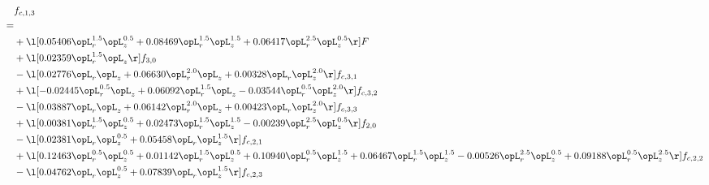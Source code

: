 \begin{alignat}{2} 
\label{eq:f_13_2} 
& f_{c,1,3} \nonumber \\ 
 = \\ 
& + \l[  0.05406 \opL_r^{1.5} \opL_z^{0.5} +  0.08469 \opL_r^{1.5} \opL_z^{1.5} +  0.06417 \opL_r^{2.5} \opL_z^{0.5}  \r] F \nonumber \\ 
& + \l[  0.02359 \opL_r^{1.5} \opL_z  \r] f_{3,0} \nonumber \\ 
& - \l[  0.02776 \opL_r \opL_z +  0.06630 \opL_r^{2.0} \opL_z +  0.00328 \opL_r \opL_z^{2.0}  \r] f_{c,3,1} \nonumber \\ 
& + \l[  -0.02445 \opL_r^{0.5} \opL_z +  0.06092 \opL_r^{1.5} \opL_z   -0.03544 \opL_r^{0.5} \opL_z^{2.0}  \r] f_{c,3,2} \nonumber \\ 
& - \l[  0.03887 \opL_r \opL_z +  0.06142 \opL_r^{2.0} \opL_z +  0.00423 \opL_r \opL_z^{2.0}  \r] f_{c,3,3} \nonumber \\ 
& + \l[  0.00381 \opL_r^{1.5} \opL_z^{0.5} +  0.02473 \opL_r^{1.5} \opL_z^{1.5}   -0.00239 \opL_r^{2.5} \opL_z^{0.5}  \r] f_{2,0} \nonumber \\ 
& - \l[  0.02381 \opL_r \opL_z^{0.5} +  0.05458 \opL_r \opL_z^{1.5}  \r] f_{c,2,1} \nonumber \\ 
& + \l[  0.12463 \opL_r^{0.5} \opL_z^{0.5} +  0.01142 \opL_r^{1.5} \opL_z^{0.5} +  0.10940 \opL_r^{0.5} \opL_z^{1.5} +  0.06467 \opL_r^{1.5} \opL_z^{1.5}   -0.00526 \opL_r^{2.5} \opL_z^{0.5} +  0.09188 \opL_r^{0.5} \opL_z^{2.5}  \r] f_{c,2,2} \nonumber \\ 
& - \l[  0.04762 \opL_r \opL_z^{0.5} +  0.07839 \opL_r \opL_z^{1.5}  \r] f_{c,2,3} \nonumber \\ 
\end{alignat} 


